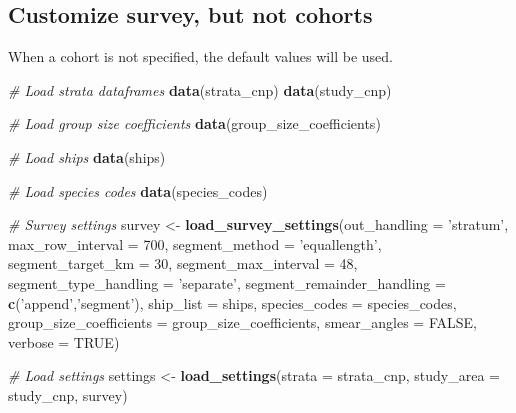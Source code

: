 \documentclass[
]{book}
\newenvironment{Shaded}{\begin{snugshade}}{\end{snugshade}}
\newcommand{\CommentTok}[1]{\textcolor[rgb]{0.56,0.35,0.01}{\textit{#1}}}
\newcommand{\DataTypeTok}[1]{\textcolor[rgb]{0.13,0.29,0.53}{#1}}
\newcommand{\DecValTok}[1]{\textcolor[rgb]{0.00,0.00,0.81}{#1}}
\newcommand{\KeywordTok}[1]{\textcolor[rgb]{0.13,0.29,0.53}{\textbf{#1}}}
\newcommand{\NormalTok}[1]{#1}
\newcommand{\OtherTok}[1]{\textcolor[rgb]{0.56,0.35,0.01}{#1}}
\newcommand{\StringTok}[1]{\textcolor[rgb]{0.31,0.60,0.02}{#1}}
\begin{document}
\hypertarget{customize-survey-but-not-cohorts}{%
\subsection*{Customize survey, but not cohorts}\label{customize-survey-but-not-cohorts}}

When a cohort is not specified, the default values will be used.

\begin{Shaded}
\begin{Highlighting}[]
\CommentTok{# Load strata dataframes}
\KeywordTok{data}\NormalTok{(strata_cnp)}
\KeywordTok{data}\NormalTok{(study_cnp)}

\CommentTok{# Load group size coefficients}
\KeywordTok{data}\NormalTok{(group_size_coefficients)}

\CommentTok{# Load ships}
\KeywordTok{data}\NormalTok{(ships)}

\CommentTok{# Load species codes}
\KeywordTok{data}\NormalTok{(species_codes)}

\CommentTok{# Survey settings}
\NormalTok{survey <-}\StringTok{ }
\StringTok{  }\KeywordTok{load_survey_settings}\NormalTok{(}\DataTypeTok{out_handling =} \StringTok{'stratum'}\NormalTok{,}
                       \DataTypeTok{max_row_interval =} \DecValTok{700}\NormalTok{,}
                       \DataTypeTok{segment_method =} \StringTok{'equallength'}\NormalTok{,}
                       \DataTypeTok{segment_target_km =} \DecValTok{30}\NormalTok{,}
                       \DataTypeTok{segment_max_interval =} \DecValTok{48}\NormalTok{,}
                       \DataTypeTok{segment_type_handling =} \StringTok{'separate'}\NormalTok{,}
                       \DataTypeTok{segment_remainder_handling =} \KeywordTok{c}\NormalTok{(}\StringTok{'append'}\NormalTok{,}\StringTok{'segment'}\NormalTok{),}
                       \DataTypeTok{ship_list =}\NormalTok{ ships,}
                       \DataTypeTok{species_codes =}\NormalTok{ species_codes,}
                       \DataTypeTok{group_size_coefficients =}\NormalTok{ group_size_coefficients,}
                       \DataTypeTok{smear_angles =} \OtherTok{FALSE}\NormalTok{,}
                       \DataTypeTok{verbose =} \OtherTok{TRUE}\NormalTok{)}

\CommentTok{# Load settings}
\NormalTok{settings <-}\StringTok{ }\KeywordTok{load_settings}\NormalTok{(}\DataTypeTok{strata =}\NormalTok{ strata_cnp,}
                          \DataTypeTok{study_area =}\NormalTok{ study_cnp,}
\NormalTok{                          survey)}
\end{Highlighting}
\end{Shaded}
\end{document}
